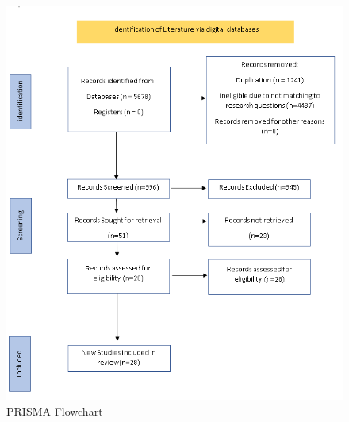 \documentclass[twocolumn]{article}
\begin{document}
\begin{figure}[p]
  \centering
  \includegraphics[width=\textwidth,keepaspectratio]{PRISMASummary.png}
  \caption{PRISMA Flowchart}\label{fig:prisma}
\end{figure}
\end{document}
